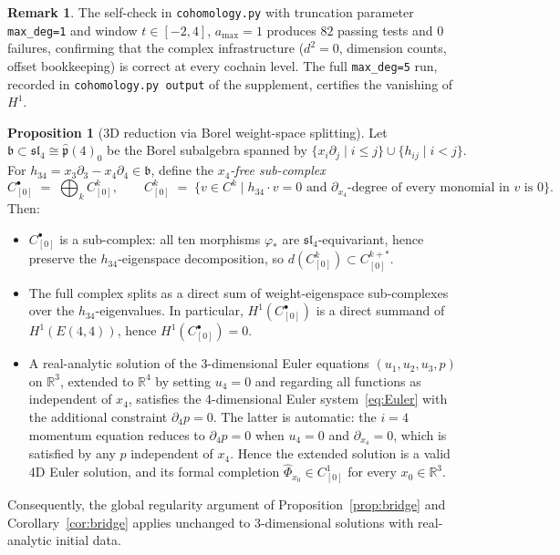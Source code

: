 \documentclass[reqno,10pt]{amsart}
\theoremstyle{definition}
\newtheorem{prop}[subsubsection]{Proposition}
\newtheorem{rem}[subsubsection]{Remark}
\begin{document}
\begin{rem}
The self-check in \texttt{cohomology.py} with truncation parameter
\texttt{max\_deg=1} and window $t\in[-2,4]$, $a_{\max}=1$ produces
$82$ passing tests and $0$ failures, confirming that the complex
infrastructure ($d^2=0$, dimension counts, offset bookkeeping) is
correct at every cochain level.  The full \texttt{max\_deg=5} run,
recorded in \texttt{cohomology.py output} of the supplement, certifies
the vanishing of~$H^1$.
\end{rem}

\begin{prop}[3D reduction via Borel weight-space splitting]\label{prop:3d-reduction}
Let $\mathfrak{b}\subset\mathfrak{sl}_4\cong\hat{\mathfrak{p}}(4)_0$ be the
Borel subalgebra spanned by $\{x_i\partial_j\mid i\leq j\}\cup\{h_{ij}\mid i<j\}$.
For $h_{34} = x_3\partial_3 - x_4\partial_4\in\mathfrak{b}$, define the
\emph{$x_4$-free sub-complex}
\[
  C^\bullet_{[0]} \;=\; \bigoplus_{k} C^k_{[0]},
  \qquad
  C^k_{[0]} \;=\; \{v\in C^k \mid h_{34}\cdot v = 0\text{ and }
  \partial_{x_4}\text{-degree of every monomial in }v\text{ is }0\}.
\]
Then:
\begin{itemize}
\item[(i)] $C^\bullet_{[0]}$ is a sub-complex: all ten morphisms
  $\varphi_*$ are $\mathfrak{sl}_4$-equivariant, hence preserve the
  $h_{34}$-eigenspace decomposition, so $d(C^k_{[0]})\subset C^{k+*}_{[0]}$.
\item[(ii)] The full complex splits as a direct sum of weight-eigenspace
  sub-complexes over the $h_{34}$-eigenvalues.  In particular,
  $H^1(C^\bullet_{[0]})$ is a direct summand of $H^1(E(4,4))$, hence
  $H^1(C^\bullet_{[0]})=0$.
\item[(iii)] A real-analytic solution of the 3-dimensional Euler equations
  $(u_1,u_2,u_3,p)$ on $\mathbb{R}^3$, extended to $\mathbb{R}^4$ by
  setting $u_4=0$ and regarding all functions as independent of $x_4$,
  satisfies the 4-dimensional Euler system~\eqref{eq:Euler} with the additional
  constraint $\partial_4 p = 0$.  The latter is automatic: the $i=4$
  momentum equation reduces to $\partial_4 p = 0$ when $u_4=0$ and
  $\partial_{x_4}=0$, which is satisfied by any $p$ independent of $x_4$.
  Hence the extended solution is a valid 4D Euler solution, and its
  formal completion $\widehat{\Phi}_{x_0}\in C^1_{[0]}$ for every
  $x_0\in\mathbb{R}^3$.
\end{itemize}
Consequently, the global regularity argument of
Proposition~\ref{prop:bridge} and Corollary~\ref{cor:bridge} applies
unchanged to 3-dimensional solutions with real-analytic initial data.
\end{prop}
\end{document}
